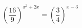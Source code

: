 \begin{ex}[type=equation]
	\begin{condition}
		$\left(\dfrac{16}{9}\right)^{x^2 + 2x}=\left(\dfrac{3}{4}\right)^{x - 3}$
	\end{condition}
\end{ex}